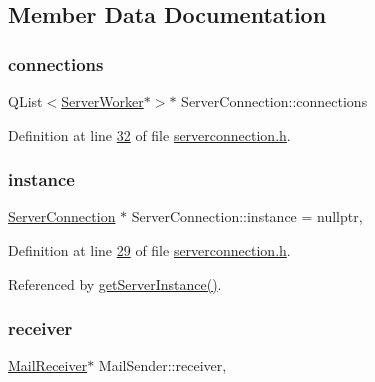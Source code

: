 \subsection{Member Data Documentation}
\mbox{\label{a00238_a7d9e1b1ac7c2d57b439ab5918e7c31d0}} 
\subsubsection{\texorpdfstring{connections}{connections}}
{\footnotesize\ttfamily Q\+List$<$\hyperlink{a00242}{Server\+Worker}$\ast$$>$$\ast$ Server\+Connection\+::connections\hspace{0.3cm}{\ttfamily [protected]}}



Definition at line \hyperlink{a00131_source_l00032}{32} of file \hyperlink{a00131_source}{serverconnection.\+h}.

\mbox{\label{a00238_adbbe8ffe6ee71b0aee4db9b6e689ba2a}} 
\subsubsection{\texorpdfstring{instance}{instance}}
{\footnotesize\ttfamily \hyperlink{a00238}{Server\+Connection} $\ast$ Server\+Connection\+::instance = nullptr\hspace{0.3cm}{\ttfamily [static]}, {\ttfamily [protected]}}



Definition at line \hyperlink{a00131_source_l00029}{29} of file \hyperlink{a00131_source}{serverconnection.\+h}.



Referenced by \hyperlink{a00131_source_l00018}{get\+Server\+Instance()}.

\mbox{\label{a00162_aa57ce2f74f8ad76abb38974f85b97ac5}} 
\subsubsection{\texorpdfstring{receiver}{receiver}}
{\footnotesize\ttfamily \hyperlink{a00154}{Mail\+Receiver}$\ast$ Mail\+Sender\+::receiver\hspace{0.3cm}{\ttfamily [protected]}, {\ttfamily [inherited]}}



